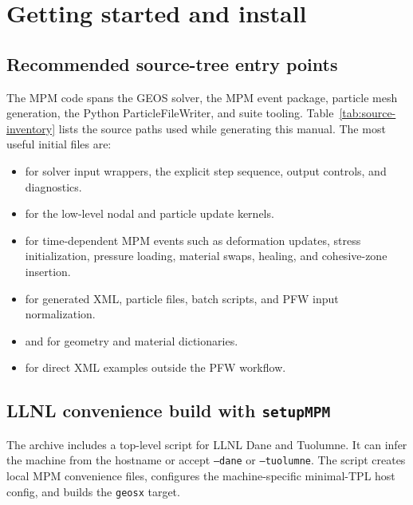 \chapter{Getting started and install}
\label{ch:getting-started}

\section{Recommended source-tree entry points}
The MPM code spans the GEOS solver, the MPM event package, particle mesh generation, the Python ParticleFileWriter, and suite tooling.  Table~\ref{tab:source-inventory} lists the source paths used while generating this manual.  The most useful initial files are:

\begin{itemize}[leftmargin=*]
\item {} for solver input wrappers, the explicit step sequence, output controls, and diagnostics.
\item {} for the low-level nodal and particle update kernels.
\item {} for time-dependent MPM events such as deformation updates, stress initialization, pressure loading, material swaps, healing, and cohesive-zone insertion.
\item {} for generated XML, particle files, batch scripts, and PFW input normalization.
\item {} and  for geometry and material dictionaries.
\item {} for direct XML examples outside the PFW workflow.
\end{itemize}

\section{LLNL convenience build with \texttt{setupMPM}}
\label{sec:setupMPM}
The archive includes a top-level  script for LLNL Dane and Tuolumne.  It can infer the machine from the hostname or accept \texttt{--dane} or \texttt{--tuolumne}.  The script creates local MPM convenience files, configures the machine-specific minimal-TPL host config, and builds the \texttt{geosx} target.

